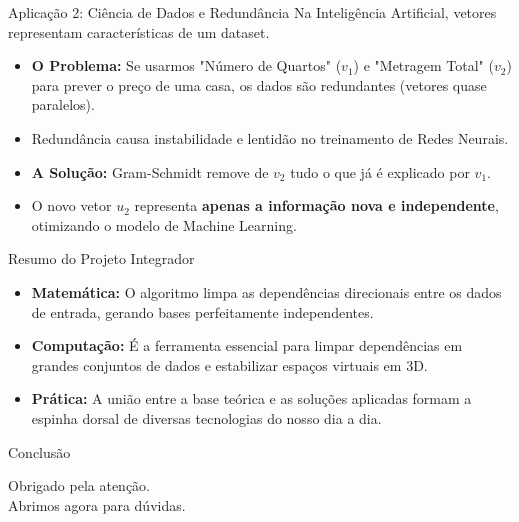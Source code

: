 \documentclass{beamer}
\begin{document}
\begin{frame}{Aplicação 2: Ciência de Dados e Redundância}
Na Inteligência Artificial, vetores representam características de um dataset.
\vspace{0.3cm}
\begin{itemize}
    \item \textbf{O Problema:} Se usarmos "Número de Quartos" ($v_1$) e "Metragem Total" ($v_2$) para prever o preço de uma casa, os dados são redundantes (vetores quase paralelos).
    \item Redundância causa instabilidade e lentidão no treinamento de Redes Neurais.
    \item \textbf{A Solução:} Gram-Schmidt remove de $v_2$ tudo o que já é explicado por $v_1$.
    \item O novo vetor $u_2$ representa \textbf{apenas a informação nova e independente}, otimizando o modelo de Machine Learning.
\end{itemize}
\end{frame}

\begin{frame}{Resumo do Projeto Integrador}
\begin{itemize}
    \item \textbf{Matemática:} O algoritmo limpa as dependências direcionais entre os dados de entrada, gerando bases perfeitamente independentes.
    \item \textbf{Computação:} É a ferramenta essencial para limpar dependências em grandes conjuntos de dados e estabilizar espaços virtuais em 3D.
    \item \textbf{Prática:} A união entre a base teórica e as soluções aplicadas formam a espinha dorsal de diversas tecnologias do nosso dia a dia.
\end{itemize}
\end{frame}

\begin{frame}{Conclusão}
\begin{center}
\Large Obrigado pela atenção. \\
\vspace{0.5cm}
Abrimos agora para dúvidas.
\end{center}
\end{frame}
\end{document}
